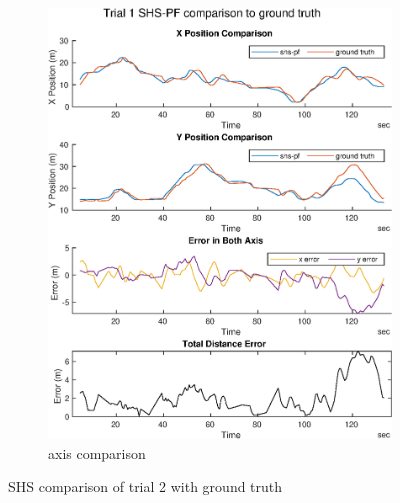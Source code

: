 \begin{figure}[H]
\begin{subfigure}[t]{.45\textwidth}
		\includegraphics[width=\linewidth]{images/20201029_1603_shs-pf_trial_1_1}
		\caption{axis comparison}
		\label{fig:shspf_trial2_comparison}
	\end{subfigure}
	\caption{SHS comparison of trial 2 with ground truth}
	\label{fig:shspf_trial2_shs_gt_comparison}
\end{figure}

